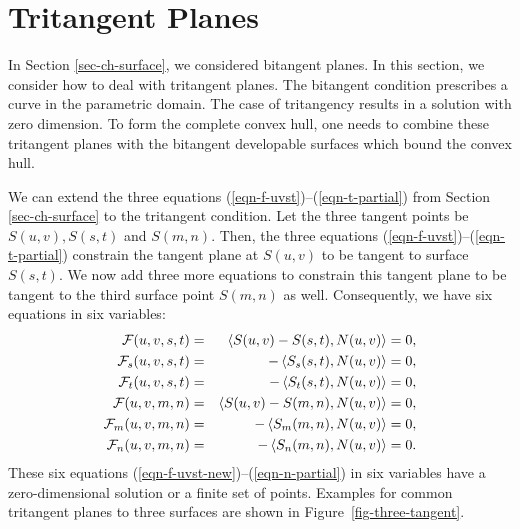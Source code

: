 \documentclass{elsart}
\begin{document}
\section{Tritangent Planes}
\label{sec-tri-tangencies}

In Section \ref{sec-ch-surface}, we considered bitangent planes.
In this section, we consider how to deal with tritangent planes.
The bitangent condition prescribes a curve in the parametric domain.
The case of tritangency results in a solution with zero dimension. 
To form the complete convex hull, one needs to combine 
these tritangent planes with the bitangent developable surfaces which
bound the convex hull.

We can extend the three equations (\ref{eqn-f-uvst})--(\ref{eqn-t-partial})
from Section \ref{sec-ch-surface} to the tritangent condition. 
Let the three tangent points be $S(u,v), S(s,t)$ and $S(m,n)$.
Then, the three equations (\ref{eqn-f-uvst})--(\ref{eqn-t-partial}) 
constrain the tangent plane at $S(u,v)$ to be tangent to 
surface $S(s,t)$. We now add three more equations to constrain 
this tangent plane to be tangent to the third surface point 
$S(m,n)$ as well.  Consequently, we have six equations in six variables:
%
%
\begin{eqnarray}
   {\mathcal F}(u,v,s,t) &=& \left<{S(u,v)-S(s,t)}, {N(u,v)} \right> = 0, \label{eqn-f-uvst-new} \\
   {\mathcal F}_s(u,v,s,t) &=& -\left<{S_s(s,t)}, {N(u,v)} \right> = 0, \label{eqn-s-partial-new}\\
   {\mathcal F}_t(u,v,s,t) &=& -\left<{S_t(s,t)}, {N(u,v)} \right> = 0, \label{eqn-t-partial-new} \\
{\mathcal F}(u,v,m,n) &=& \left<{S(u,v)-S(m,n)}, {N(u,v)} \right> \label{eqn-g-uvmn} = 0,\\
{\mathcal F}_m(u,v,m,n) &=& -\left<{S_m(m,n)}, {N(u,v)} \right> = 0, \label{eqn-m-partial}\\
{\mathcal F}_n(u,v,m,n) &=& -\left<{S_n(m,n)}, {N(u,v)} \right> = 0. \label{eqn-n-partial}
\end{eqnarray}
These six equations (\ref{eqn-f-uvst-new})--(\ref{eqn-n-partial})
%
%
in six variables have a zero-dimensional solution or a finite set of points.
%
%
Examples for common tritangent planes to three surfaces are shown in
Figure~\ref{fig-three-tangent}.
\end{document}
